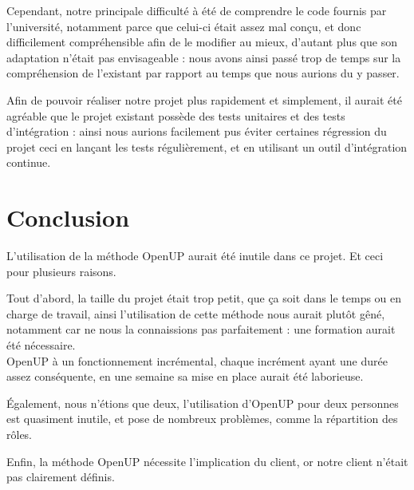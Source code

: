 \documentclass[a4paper, 11pt]{article}
\begin{document}
	Cependant, notre principale difficulté à été de comprendre le code fournis par l'université, notamment parce que celui-ci était assez mal conçu, et donc difficilement
	compréhensible afin de le modifier au mieux, d'autant plus que son adaptation n'était pas envisageable : nous avons ainsi passé trop de temps sur la
	compréhension de l'existant par rapport au temps que nous aurions du y passer.

	Afin de pouvoir réaliser notre projet plus rapidement et simplement, il aurait été agréable que le projet existant possède des tests unitaires et des tests
	d'intégration : ainsi nous aurions facilement pus éviter certaines régression du projet ceci en lançant les tests régulièrement, et en utilisant un outil
	d'intégration continue.

	\newpage
	\section{Conclusion}
	L'utilisation de la méthode OpenUP aurait été inutile dans ce projet. Et ceci pour plusieurs raisons.

	Tout d'abord, la taille du projet était trop petit, que ça soit dans le temps ou en charge de travail, ainsi l'utilisation de cette méthode nous aurait
	plutôt gêné, notamment car ne nous la connaissions pas parfaitement : une formation aurait été nécessaire.\\
	OpenUP à un fonctionnement incrémental, chaque incrément ayant une durée assez conséquente, en une semaine sa mise en place aurait été laborieuse.
	
	Également, nous n'étions que deux, l'utilisation d'OpenUP pour deux personnes est quasiment inutile, et pose de nombreux problèmes, comme la répartition des
	rôles.

	Enfin, la méthode OpenUP nécessite l'implication du client, or notre client n'était pas clairement définis.
\end{document}
